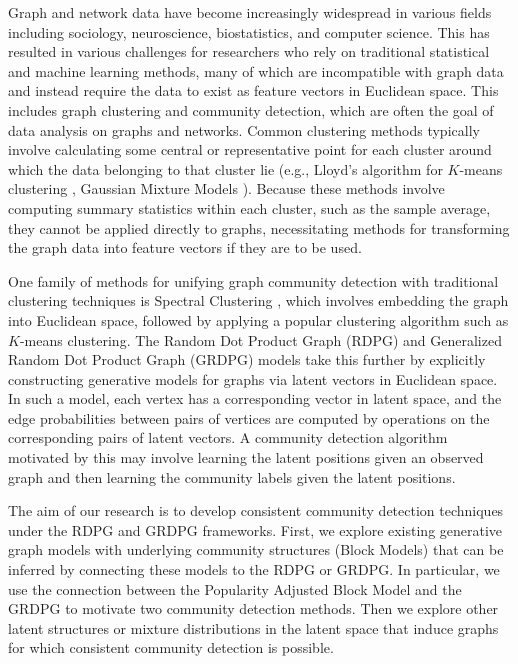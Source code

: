 \documentclass[
  11pt,
]{article}
\begin{document}
Graph and network data have become increasingly widespread in various
fields including sociology, neuroscience, biostatistics, and computer
science. This has resulted in various challenges for researchers who
rely on traditional statistical and machine learning methods, many of
which are incompatible with graph data and instead require the data to
exist as feature vectors in Euclidean space. This includes graph
clustering and community detection, which are often the goal of data
analysis on graphs and networks. Common clustering methods typically
involve calculating some central or representative point for each
cluster around which the data belonging to that cluster lie (e.g.,
Lloyd's algorithm for \(K\)-means clustering \cite{1056489}, Gaussian
Mixture Models \cite{doi:10.1198/016214502760047131}). Because these
methods involve computing summary statistics within each cluster, such
as the sample average, they cannot be applied directly to graphs,
necessitating methods for transforming the graph data into feature
vectors if they are to be used.

One family of methods for unifying graph community detection with
traditional clustering techniques is Spectral Clustering
\cite{DBLP:journals/corr/abs-0711-0189}, which involves embedding the
graph into Euclidean space, followed by applying a popular clustering
algorithm such as \(K\)-means clustering. The Random Dot Product Graph
(RDPG) \cite{10.1007/978-3-540-77004-6_11} and Generalized Random Dot
Product Graph (GRDPG) \cite{rubindelanchy2017statistical} models take
this further by explicitly constructing generative models for graphs via
latent vectors in Euclidean space. In such a model, each vertex has a
corresponding vector in latent space, and the edge probabilities between
pairs of vertices are computed by operations on the corresponding pairs
of latent vectors. A community detection algorithm motivated by this may
involve learning the latent positions given an observed graph and then
learning the community labels given the latent positions.

The aim of our research is to develop consistent community detection
techniques under the RDPG and GRDPG frameworks. First, we explore
existing generative graph models with underlying community structures
(Block Models) that can be inferred by connecting these models to the
RDPG or GRDPG. In particular, we use the connection between the
Popularity Adjusted Block Model \cite{307cbeb9b1be48299388437423d94bf1}
and the GRDPG to motivate two community detection methods. Then we
explore other latent structures or mixture distributions in the latent
space that induce graphs for which consistent community detection is
possible.
\end{document}

